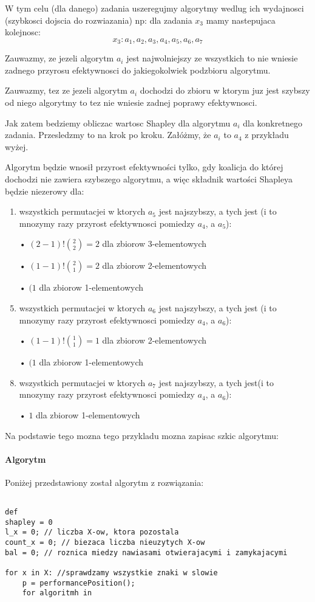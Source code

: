 \documentclass[oneside]{book}
\begin{document}
 
 W tym celu (dla danego) zadania uszeregujmy algorytmy wedlug ich wydajnosci (szybkosci dojscia do rozwiazania) np: dla zadania $x_3$ mamy nastepujaca kolejnosc:
  $$  x_3:  a_1, a_2, a_3, a_4, a_5, a_6, a_7 $$
  
 Zauwazmy, ze jezeli algorytm $a_i$ jest najwolniejszy ze wszystkich to nie wniesie zadnego przyrosu efektywnosci do jakiegokolwiek podzbioru algorytmu.
 
 Zauwazmy, tez ze jezeli algorytm $a_i$ dochodzi do zbioru w ktorym juz jest szybszy od niego algorytmy to tez nie wniesie zadnej poprawy efektywnosci.
 
 Jak zatem bedziemy obliczac wartosc Shapley dla algorytmu $a_i$ dla konkretnego zadania. Przesledzmy to na krok po kroku. Załóżmy, że $a_i$ to $a_4$ z przykładu wyżej.
 

Algorytm będzie wnosił przyrost efektywności tylko, gdy koalicja do której dochodzi nie zawiera szybszego algorytmu, a więc składnik wartości Shapleya będzie niezerowy dla:
\begin{enumerate}
\item wszystkich permutacjei w ktorych $a_5$ jest najszybszy, a tych jest (i to mnozymy razy przyrost efektywnosci pomiedzy $a_4$, a $a_5$):
\item[•] $(2-1)! {2 \choose 2} = 2$ dla zbiorow 3-elementowych 
\item[•] $(1-1)! {2 \choose 1} = 2$ dla zbiorow 2-elementowych 
\item[•] $(1$ dla zbiorow 1-elementowych   

\item wszystkich permutacjei w ktorych $a_6$ jest najszybszy, a tych jest (i to mnozymy razy przyrost efektywnosci pomiedzy $a_4$, a $a_6$):
\item[•] $(1-1)!  {1 \choose 1}= 1$ dla zbiorow 2-elementowych 
\item[•] $(1$ dla zbiorow 1-elementowych   
\item wszystkich permutacjei w ktorych $a_7$ jest najszybszy, a tych jest(i to mnozymy razy przyrost efektywnosci pomiedzy $a_4$, a $a_6$):
\item[•] $1$ dla zbiorow 1-elementowych   
\end{enumerate}


Na podstawie tego mozna tego przykladu mozna zapisac szkic algorytmu:
 
 

 
\paragraph{Algorytm} Poniżej przedstawiony został algorytm z rozwiązania:\\
\begin{lstlisting}

def 
shapley = 0
l_x = 0; // liczba X-ow, ktora pozostala
count_x = 0; // biezaca liczba nieuzytych X-ow
bal = 0; // roznica miedzy nawiasami otwierajacymi i zamykajacymi

for x in X: //sprawdzamy wszystkie znaki w slowie
    p = performancePosition();
    for algoritmh in  
\end{lstlisting}

 
 
\end{document}
